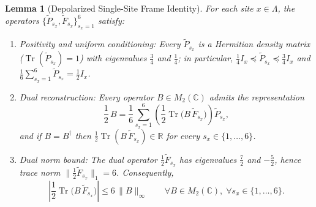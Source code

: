 \documentclass[11pt,a4paper]{article}
\numberwithin{equation}{section}
\theoremstyle{plain}
\newtheorem{lemma}[theorem]{Lemma}
\theoremstyle{definition}
\newcommand{\Tr}{\operatorname{Tr}}
\begin{document}
\begin{lemma}[Depolarized Single-Site Frame Identity]\label{lem:frame}
For each site $x\in\Lambda$, the operators $\{\widetilde{P}_{s_x},\widetilde{F}_{s_x}\}_{s_x=1}^6$ satisfy:
\begin{enumerate}
  \setlength{\itemsep}{2pt}\setlength{\parskip}{0pt}
  \item[\emph{(1)}] \emph{Positivity and uniform conditioning:} Every $\widetilde{P}_{s_x}$ is a Hermitian density matrix ($\Tr(\widetilde{P}_{s_x}) = 1$) with eigenvalues $\frac{3}{4}$ and $\frac{1}{4}$; in particular, $\frac{1}{4}I_x \preceq \widetilde{P}_{s_x} \preceq \frac{3}{4}I_x$ and $\frac{1}{6}\sum_{s_x=1}^6 \widetilde{P}_{s_x} = \frac{1}{2}I_x$.
  \item[\emph{(2)}] \emph{Dual reconstruction:} Every operator $B\in M_2(\mathbb{C})$ admits the representation
  \begin{equation}\label{eq:single-frame}
    \frac{1}{2}\,B = \frac{1}{6}\sum_{s_x=1}^6 \left(\frac{1}{2}\Tr\bigl(B\,\widetilde{F}_{s_x}\bigr)\right)\widetilde{P}_{s_x},
  \end{equation}
  and if $B = B^\dagger$ then $\frac{1}{2}\Tr(B\,\widetilde{F}_{s_x})\in\mathbb{R}$ for every $s_x\in\{1,\dots,6\}$.
  \item[\emph{(3)}] \emph{Dual norm bound:} The dual operator $\frac{1}{2}\widetilde{F}_{s_x}$ has eigenvalues $\frac{7}{2}$ and $-\frac{5}{2}$, hence trace norm $\|\frac{1}{2}\widetilde{F}_{s_x}\|_1 = 6$. Consequently,
  \begin{equation}\label{eq:dual-bound}
    \left|\frac{1}{2}\Tr\bigl(B\,\widetilde{F}_{s_x}\bigr)\right| \le 6\,\|B\|_\infty \qquad \forall B\in M_2(\mathbb{C}),\; \forall s_x\in\{1,\dots,6\}.
  \end{equation}
\end{enumerate}
\end{lemma}
\end{document}
